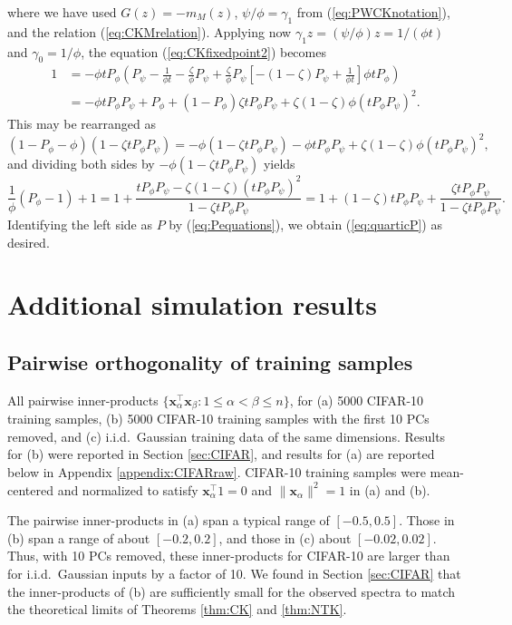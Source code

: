 \documentclass{article}
\theoremstyle{definition}
\newcommand{\x}{\mathbf{x}}
\renewcommand{\a}{\alpha}
\renewcommand{\b}{\beta}
\newcommand{\1}{\mathbf{1}}
\begin{document}
where we have used $G(z)=-m_M(z)$, $\psi/\phi=\gamma_1$ from
(\ref{eq:PWCKnotation}),
and the relation (\ref{eq:CKMrelation}).
Applying now $\gamma_1 z=(\psi/\phi)z=1/(\phi t)$ and $\gamma_0=1/\phi$,
the equation (\ref{eq:CKfixedpoint2}) becomes
\begin{align*}
1&=-\phi t P_\phi \left(P_\psi-\frac{1}{\phi t}
-\frac{\zeta}{\phi} P_\psi+\frac{\zeta}{\phi} P_\psi\left[
-(1-\zeta)P_\psi+\frac{1}{\phi t}\right]\phi t P_\phi\right)\\
&=-\phi tP_\phi P_\psi+P_\phi+(1-P_\phi)\zeta tP_\phi P_\psi
+\zeta(1-\zeta)\phi(tP_\phi P_\psi)^2.
\end{align*}
This may be rearranged as
\[(1-P_\phi-\phi)(1-\zeta tP_\phi P_\psi)
=-\phi(1-\zeta tP_\phi P_\psi)-\phi tP_\phi
P_\psi+\zeta(1-\zeta)\phi(tP_\phi P_\psi)^2,\]
and dividing both sides by $-\phi(1-\zeta tP_\phi P_\psi)$ yields
\[\frac{1}{\phi}(P_\phi-1)+1
=1+\frac{tP_\phi P_\psi-\zeta(1-\zeta)(tP_\phi P_\psi)^2}{1-\zeta tP_\phi
P_\psi}
=1+(1-\zeta)tP_\phi P_\psi+\frac{\zeta tP_\phi P_\psi}{1-\zeta tP_\phi P_\psi}.\]
Identifying the left side as $P$ by (\ref{eq:Pequations}), we obtain
(\ref{eq:quarticP}) as desired.

\section{Additional simulation results}

\subsection{Pairwise orthogonality of training samples}\label{appendix:orthogonality_for_data}


%
%

All pairwise inner-products $\{\x_\a^\top \x_\b:1 \leq \a<\b
\leq n\}$, for (a) 5000 CIFAR-10 training samples, (b) 5000 CIFAR-10 training
samples with the first 10 PCs removed, and (c) i.i.d.\ Gaussian training data
of the same dimensions. Results for (b) were reported in Section
\ref{sec:CIFAR}, and results for (a) are reported below in Appendix
\ref{appendix:CIFARraw}. CIFAR-10 training samples were mean-centered and
normalized to satisfy $\x_\a^\top 1=0$ and $\|\x_\a\|^2=1$ in (a) and (b).

The pairwise inner-products in (a) span a typical range
of $[-0.5,0.5]$. Those in (b) span a range of about
$[-0.2,0.2]$, and those in (c) about $[-0.02,0.02]$. Thus,
with 10 PCs removed, these inner-products for CIFAR-10 are larger than
for i.i.d.\ Gaussian inputs by a factor of 10. We found in Section
\ref{sec:CIFAR} that the inner-products of (b) are sufficiently small for the
observed spectra to match the theoretical limits of
Theorems \ref{thm:CK} and \ref{thm:NTK}.
\end{document}

